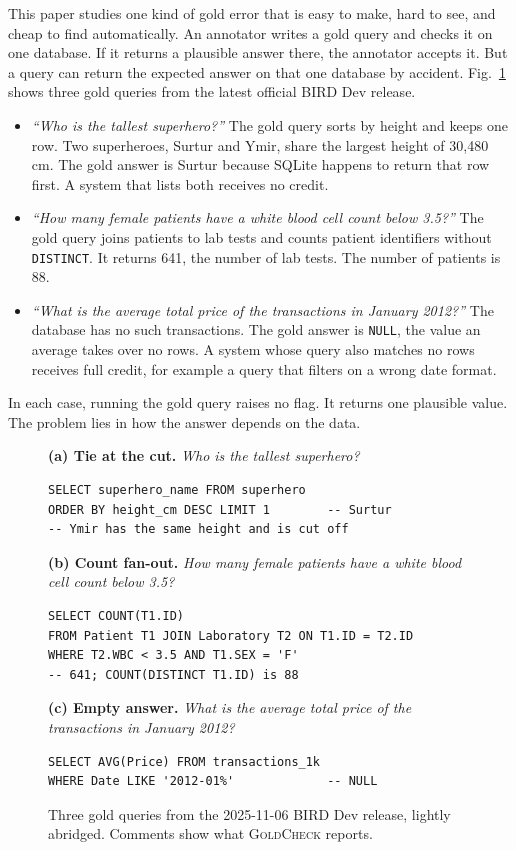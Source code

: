 \documentclass[conference]{IEEEtran}
\newcommand{\sys}{\textsc{GoldCheck}}
\begin{document}
This paper studies one kind of gold error that is easy to make, hard to see,
and cheap to find automatically. An annotator writes a gold query and checks it
on one database. If it returns a plausible answer there, the annotator accepts
it. But a query can return the expected answer on that one database by accident.
Fig.~\ref{fig:examples} shows three gold queries from the latest official BIRD
Dev release.
\begin{itemize}
\item \emph{``Who is the tallest superhero?''} The gold query sorts by height and
keeps one row. Two superheroes, Surtur and Ymir, share the largest height of
30,480\,cm. The gold answer is Surtur because SQLite happens to return that row
first. A system that lists both receives no credit.
\item \emph{``How many female patients have a white blood cell count below
3.5?''} The gold query joins patients to lab tests and counts patient
identifiers without \texttt{DISTINCT}. It returns 641, the number of lab tests.
The number of patients is 88.
\item \emph{``What is the average total price of the transactions in January
2012?''} The database has no such transactions. The gold answer is
\texttt{NULL}, the value an average takes over no rows. A system whose query
also matches no rows receives full credit, for example a query that filters on a
wrong date format.
\end{itemize}
In each case, running the gold query raises no flag. It returns one plausible
value. The problem lies in how the answer depends on the data.

\begin{figure}[t]
\small
\textbf{(a) Tie at the cut.} \emph{Who is the tallest superhero?}
\begin{lstlisting}
SELECT superhero_name FROM superhero
ORDER BY height_cm DESC LIMIT 1        -- Surtur
-- Ymir has the same height and is cut off
\end{lstlisting}
\textbf{(b) Count fan-out.} \emph{How many female patients have a white
blood cell count below 3.5?}
\begin{lstlisting}
SELECT COUNT(T1.ID)
FROM Patient T1 JOIN Laboratory T2 ON T1.ID = T2.ID
WHERE T2.WBC < 3.5 AND T1.SEX = 'F'
-- 641; COUNT(DISTINCT T1.ID) is 88
\end{lstlisting}
\textbf{(c) Empty answer.} \emph{What is the average total price of the
transactions in January 2012?}
\begin{lstlisting}
SELECT AVG(Price) FROM transactions_1k
WHERE Date LIKE '2012-01%'             -- NULL
\end{lstlisting}
\caption{Three gold queries from the 2025-11-06 BIRD Dev release, lightly
abridged. Comments show what \sys{} reports.}
\label{fig:examples}
\end{figure}
\end{document}
